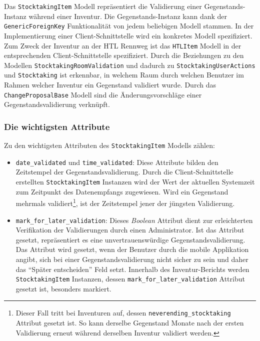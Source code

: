Das \texttt{StocktakingItem} Modell repräsentiert die Validierung einer
Gegenstands-Instanz während einer Inventur. Die Gegenstands-Instanz kann
dank der \texttt{GenericForeignKey} Funktionalität
\cite{django-doku-contenttypes} von jedem beliebigen Modell stammen. In
der Implementierung einer Client-Schnittstelle wird ein konkretes Modell
spezifiziert. Zum Zweck der Inventur an der HTL Rennweg ist das
\texttt{HTLItem} Modell in der entsprechenden Client-Schnittstelle
spezifiziert. Durch die Beziehungen zu den Modellen
\texttt{StocktakingRoomValidation} und dadurch zu
\texttt{StocktakingUserActions} und \texttt{Stocktaking} ist erkennbar,
in welchem Raum durch welchen Benutzer im Rahmen welcher Inventur ein
Gegenstand validiert wurde. Durch das \texttt{ChangeProposalBase} Modell
sind die Änderungsvorschläge einer Gegenstandsvalidierung verknüpft.

\hypertarget{die-wichtigsten-attribute-3}{%
\subsubsection{Die wichtigsten
Attribute}\label{die-wichtigsten-attribute-3}}

Zu den wichtigsten Attributen des \texttt{StocktakingItem} Modells
zählen:

\begin{itemize}
\tightlist
\item
  \texttt{date\_validated} und \texttt{time\_validated}: Diese Attribute
  bilden den Zeitstempel der Gegenstandsvalidierung. Durch die
  Client-Schnittstelle erstellten \texttt{StocktakingItem} Instanzen
  wird der Wert der aktuellen Systemzeit zum Zeitpunkt des Datenempfangs
  zugewiesen. Wird ein Gegenstand mehrmals validiert\footnote{Dieser
    Fall tritt bei Inventuren auf, dessen
    \texttt{neverending\_stocktaking} Attribut gesetzt ist. So kann
    derselbe Gegenstand Monate nach der ersten Validierung erneut
    während derselben Inventur validiert werden.}, ist der Zeitstempel
  jener der jüngsten Validierung.
\item
  \texttt{mark\_for\_later\_validation}: Dieses
  \emph{Boolean}
  Attribut dient zur erleichterten Verifikation der Validierungen durch
  einen Administrator. Ist das Attribut gesetzt, repräsentiert es eine
  unvertrauenswürdige Gegenstandsvalidierung. Das Attribut wird gesetzt,
  wenn der Benutzer durch die mobile Applikation angibt, sich bei einer
  Gegenstandsvalidierung nicht sicher zu sein und daher das ``Später
  entscheiden'' Feld setzt. Innerhalb des Inventur-Berichts werden
  \texttt{StocktakingItem} Instanzen, dessen
  \texttt{mark\_for\_later\_validation} Attribut gesetzt ist, besonders
  markiert.
\end{itemize}


